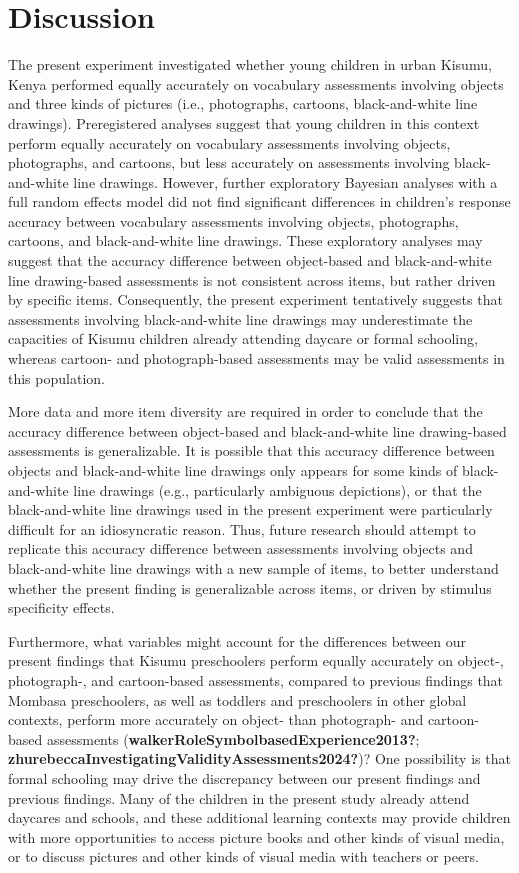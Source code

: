 \documentclass[10pt, letterpaper]{article}
\begin{document}
\section{Discussion}\label{discussion}

The present experiment investigated whether young children in urban
Kisumu, Kenya performed equally accurately on vocabulary assessments
involving objects and three kinds of pictures (i.e., photographs,
cartoons, black-and-white line drawings). Preregistered analyses suggest
that young children in this context perform equally accurately on
vocabulary assessments involving objects, photographs, and cartoons, but
less accurately on assessments involving black-and-white line drawings.
However, further exploratory Bayesian analyses with a full random
effects model did not find significant differences in children's
response accuracy between vocabulary assessments involving objects,
photographs, cartoons, and black-and-white line drawings. These
exploratory analyses may suggest that the accuracy difference between
object-based and black-and-white line drawing-based assessments is not
consistent across items, but rather driven by specific items.
Consequently, the present experiment tentatively suggests that
assessments involving black-and-white line drawings may underestimate
the capacities of Kisumu children already attending daycare or formal
schooling, whereas cartoon- and photograph-based assessments may be
valid assessments in this population.

More data and more item diversity are required in order to conclude that
the accuracy difference between object-based and black-and-white line
drawing-based assessments is generalizable. It is possible that this
accuracy difference between objects and black-and-white line drawings
only appears for some kinds of black-and-white line drawings (e.g.,
particularly ambiguous depictions), or that the black-and-white line
drawings used in the present experiment were particularly difficult for
an idiosyncratic reason. Thus, future research should attempt to
replicate this accuracy difference between assessments involving objects
and black-and-white line drawings with a new sample of items, to better
understand whether the present finding is generalizable across items, or
driven by stimulus specificity effects.

Furthermore, what variables might account for the differences between
our present findings that Kisumu preschoolers perform equally accurately
on object-, photograph-, and cartoon-based assessments, compared to
previous findings that Mombasa preschoolers, as well as toddlers and
preschoolers in other global contexts, perform more accurately on
object- than photograph- and cartoon-based assessments
(\textbf{walkerRoleSymbolbasedExperience2013?};
\textbf{zhurebeccaInvestigatingValidityAssessments2024?})? One
possibility is that formal schooling may drive the discrepancy between
our present findings and previous findings. Many of the children in the
present study already attend daycares and schools, and these additional
learning contexts may provide children with more opportunities to access
picture books and other kinds of visual media, or to discuss pictures
and other kinds of visual media with teachers or peers.
\end{document}
